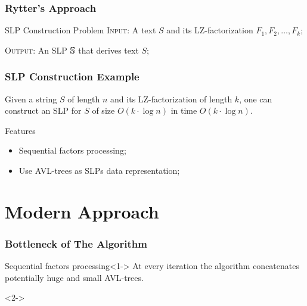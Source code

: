 \documentclass{beamer}
\begin{document}
\begin{frame}
\frametitle{Rytter's Approach}

\begin{block}{SLP Construction Problem}
\textsc{Input:} A text $S$ and its LZ-factorization $F_1, F_2, \dots, F_k$;

\textsc{Output:} An SLP $\mathbb{S}$ that derives text $S$;
\end{block}

\pause

\begin{example}
	\begin{center}
		\RytterExample
	\end{center}
\end{example}

\end{frame}

\begin{frame}
\frametitle{SLP Construction Example}

\begin{theorem}[Rytter]
Given a string $S$ of length $n$ and its LZ-factorization of length $k$, one
can construct an SLP for $S$ of size $O(k \cdot \log n)$ in time $O(k \cdot \log
n)$.
\end{theorem}

\pause

\begin{block}{Features}
	\begin{itemize}
	  \item Sequential factors processing;
	  \item Use AVL-trees as SLPs data representation;
	\end{itemize}
\end{block}
\end{frame}

\section{Modern Approach}
\begin{frame}
\frametitle{Bottleneck of The Algorithm}

\begin{alertblock}{Sequential factors processing}<1->
At every iteration the algorithm concatenates potentially huge and small
AVL-trees.
\end{alertblock}

\begin{example}<2->
	\begin{center}
		\BottleneckExample
	\end{center}
\end{example}

\end{frame}
\end{document}
